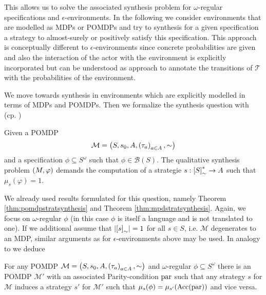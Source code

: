 This allows us to solve the associated synthesis problem for $\omega$-regular
specifications and $\epsilon$-environments. In the following we consider 
environments that are modelled as \acp{MDP} or \acp{POMDP} and try to synthesis
for a given specification a strategy to almost-surely or positively satisfy 
this specification. This approach is conceptually different to 
$\epsilon$-environments since concrete probabilities are given and also the 
interaction of the actor with the environment is explicitly incorporated but 
can be understood as approach to annotate the transitions of $\mathcal{T}$
with the probabilities of the environment.

We move towards synthesis in environments which are explicitly modelled in 
terms of \acp{MDP} and \acp{POMDP}. Then we formalize the synthesis question 
with (cp. \cite{QualAnaPOMDP, SimpleStochasticParityGames, 
ComplexProbVerification})
\begin{definition}
  Given a \ac{POMDP} 
  \begin{equation*}
    \mathcal{M} = \left(S, s_{0}, A, \left(\tau_{a}\right)_{a\in A}, \sim\right)
  \end{equation*}
  and a specification $\phi\subseteq S^{\omega}$ such that 
  $\phi\in\mathcal{B}(S)$. The qualitative synthesis problem 
  $\left(M, \varphi\right)$ demands the computation of a strategie 
  $s:\left[S\right]_{\sim}^{*}\rightarrow A$ such that $\mu_{s}(\varphi) = 1$.
\end{definition}
We already used results formulated for this question, namely Theorem 
\ref{thm:pomdpstratsynthesis} and Theorem \ref{thm:mpdstratsynthesis}. Again,
we focus on $\omega$-regular $\phi$ (in this case $\phi$ is itself a language
and is not translated to one). If we additional assume that 
$\left\vert{\left[s\right]_{\sim}}\right\vert = 1$ for all $s\in S$, i.e. $\mathcal{M}$ 
degenerates to an \ac{MDP}, similar arguments as for $\epsilon$-environments 
above may be used. In analogy to 
\cite[Proposition 4.2.3.]{ComplexProbVerification} we deduce
\begin{lemma}
  For any \ac{POMDP} $\mathcal{M} = \left(S, s_{0}, A, 
  \left(\tau_{a}\right)_{a\in A}, \sim\right)$ and $\omega$-regular 
  $\phi\subseteq S^{\omega}$ there is an \ac{POMDP} $\mathcal{M'}$ with an 
  associated Parity-condition $\operatorname{par}$ such that any strategy $s$ for 
  $\mathcal{M}$ induces a strategy $s'$ for $\mathcal{M'}$ such that 
  $\mu_{s}(\phi) = \mu_{s'}(\operatorname{Acc}(\operatorname{par}))$ and vice versa.
  \label{lem:POMDPomegareg}
\end{lemma}
